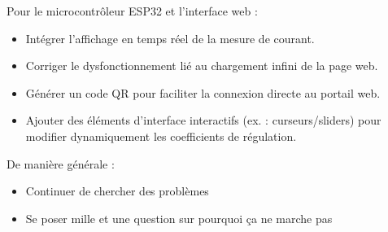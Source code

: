 Pour le microcontrôleur ESP32 et l'interface web :
\begin{itemize}
    \item Intégrer l'affichage en temps réel de la mesure de courant.
    \item Corriger le dysfonctionnement lié au chargement infini de la page web.
    \item Générer un code QR pour faciliter la connexion directe au portail web.
    \item Ajouter des éléments d'interface interactifs (ex. : curseurs/sliders) pour modifier dynamiquement les coefficients de régulation.
\end{itemize}

De manière générale :
\begin{itemize}
    \item Continuer de chercher des problèmes
    \item Se poser mille et une question sur pourquoi ça ne marche pas
\end{itemize}
